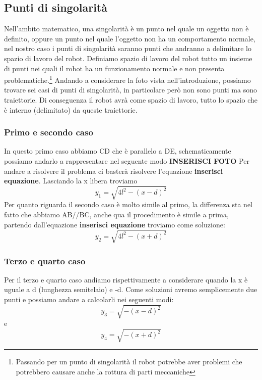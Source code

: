 \subsection{Punti di singolarità}
Nell'ambito matematico, una singolarità è un punto nel quale un oggetto non è definito, oppure un punto nel quale l'oggetto non ha un comportamento normale, nel nostro caso i punti di singolarità saranno punti che andranno a delimitare lo spazio di lavoro del robot. Definiamo spazio di lavoro del robot tutto un insieme di punti nei quali il robot ha un funzionamento normale e non presenta problematiche.\footnote{Passando per un punto di singolarità il robot potrebbe aver problemi che potrebbero causare anche la rottura di parti meccaniche} Andando a considerare la foto vista nell'introduzione, possiamo trovare sei casi di punti di singolarità, in particolare però non sono punti ma sono traiettorie. Di conseguenza il robot avrà come spazio di lavoro, tutto lo spazio che è interno (delimitato) da queste traiettorie.
\subsubsection{Primo e secondo caso}
In questo primo caso abbiamo CD che è parallelo a DE, schematicamente possiamo andarlo a rappresentare nel seguente modo \textbf{INSERISCI FOTO}
Per andare a risolvere il problema ci basterà risolvere l'equazione \textbf{inserisci equazione}. Lasciando la x libera troviamo 
\begin{equation}
    y_1 = \sqrt{4l^2-(x-d)^2}
\end{equation}
Per quanto riguarda il secondo caso è molto simile al primo, la differenza sta nel fatto che abbiamo AB//BC, anche qua il procedimento è simile a prima, partendo dall'equazione \textbf{inserisci equazione} troviamo come soluzione:
\begin{equation}
    y_2 = \sqrt{4l^2-(x+d)^2}
\end{equation}
\subsubsection{Terzo e quarto caso}
Per il terzo e quarto caso andiamo rispettivamente a considerare quando la x è uguale a d (lunghezza semitelaio) e -d. Come soluzioni avremo semplicemente due punti e possiamo andare a calcolarli nei seguenti modi:
\begin{equation}
    y_3 = \sqrt{-(x-d)^2}
\end{equation}
e
\begin{equation}
    y_4 = \sqrt{-(x+d)^2}
\end{equation}

